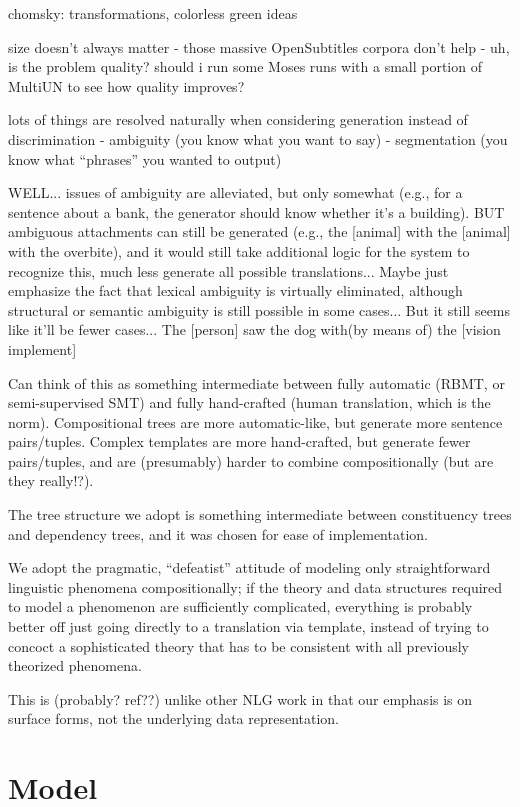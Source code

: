 chomsky: transformations, colorless green ideas


size doesn't always matter - those massive OpenSubtitles corpora don't help
- uh, is the problem quality? should i run some Moses runs with a small portion of MultiUN to see how quality improves?

lots of things are resolved naturally when considering generation instead of discrimination
- ambiguity (you know what you want to say)
- segmentation (you know what ``phrases'' you wanted to output)

WELL... issues of ambiguity are alleviated, but only somewhat (e.g., for a sentence about a bank, the generator should know whether it's a building). 
BUT ambiguous attachments can still be generated (e.g., the [animal] with the [animal] with the overbite), and it would still take additional logic for the system to recognize this, much less generate all possible translations...
Maybe just emphasize the fact that lexical ambiguity is virtually eliminated, although structural or semantic ambiguity is still possible in some cases...
But it still seems like it'll be fewer cases... The [person] saw the dog with(by means of) the [vision implement]


Can think of this as something intermediate between fully automatic (RBMT, or semi-supervised SMT) and fully hand-crafted (human translation, which is the norm).
Compositional trees are more automatic-like, but generate more sentence pairs/tuples.
Complex templates are more hand-crafted, but generate fewer pairs/tuples, and are (presumably) harder to combine compositionally (but are they really!?).

The tree structure we adopt is something intermediate between constituency trees and dependency trees, and it was chosen for ease of implementation.

We adopt the pragmatic, ``defeatist'' attitude of modeling only straightforward linguistic phenomena compositionally; if the theory and data structures required to model a phenomenon are sufficiently complicated, everything is probably better off just going directly to a translation via template, instead of trying to concoct a sophisticated theory that has to be consistent with all previously theorized phenomena.

This is (probably? ref??) unlike other NLG work in that our emphasis is on surface forms, not the underlying data representation.


\section{Model}

